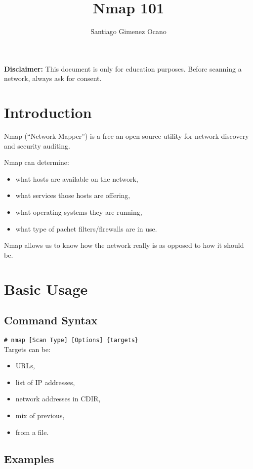 \documentclass[twocolumn]{article}
\title{Nmap 101}
\author{Santiago Gimenez Ocano}
\date{}
\begin{document}
\maketitle

\textbf{Disclaimer:} This document is only for education purposes. Before scanning a network, always ask for consent.

\section{Introduction}
Nmap (``Network Mapper'') is a free an open-source utility for network discovery and security auditing.

Nmap can determine:

\begin{itemize}
    \item what hosts are available on the network,
    \item what services those hosts are offering,
    \item what operating systems they are running,
    \item what type of pachet filters/firewalls are in use.
\end{itemize}

Nmap allows us to know how the network really is as opposed to how it should be.

\section{Basic Usage}
\subsection{Command Syntax}

\indent\texttt{\# nmap [Scan Type] [Options] \{targets\}}\\

Targets can be:

\begin{itemize}
    \item URLs,
    \item list of IP addresses,
    \item network addresses in CDIR,
    \item mix of previous,
    \item from a file.
\end{itemize}

\subsection{Examples}
\end{document}
